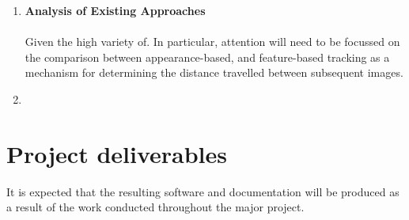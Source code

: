 \documentclass[10pt,fleqn,twoside]{article}
\begin{document}
\begin{enumerate}
	\item \textbf{Analysis of Existing Approaches} \\\\ \indent Given the high variety of. In particular, attention will need to be focussed on the comparison between appearance-based, and feature-based tracking as a mechanism for determining the distance travelled between subsequent images. 
	\item \textbf{}
\end{enumerate}


\section{Project deliverables}

It is expected that the resulting software and documentation will be produced as a result of the work conducted throughout the major project.


\nocite{*} %


\newpage
{} 

%
%

\renewcommand{\refname}{Annotated Bibliography}  %
\end{document}
